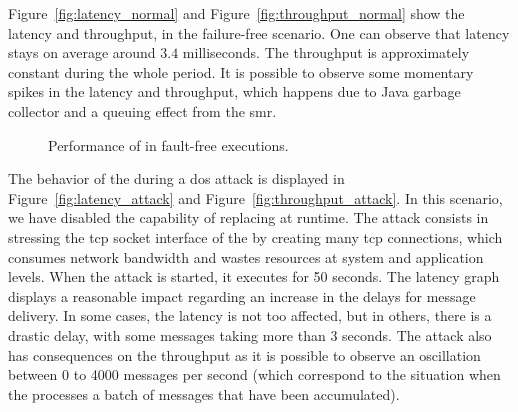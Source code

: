 Figure~\ref{fig:latency_normal} and Figure~\ref{fig:throughput_normal} show the latency and throughput, in the failure-free scenario.
One can observe that latency stays on average around $3.4$ milliseconds.
The throughput is approximately constant during the whole period.
It is possible to observe some momentary spikes in the latency and throughput, which happens due to Java garbage collector and a queuing effect from the \gls{smr}.

\begin{figure}[h]

\hspace{-5mm}
\caption{Performance of \sieveq in fault-free executions.}
\end{figure}




The behavior of the \sieveq during a \gls{dos} attack is displayed in Figure~\ref{fig:latency_attack} and Figure~\ref{fig:throughput_attack}.
In this scenario, we have disabled the \sieveq capability of replacing \presieves at runtime.
The attack consists in stressing the \gls{tcp} socket interface of the \presieves by creating many \gls{tcp} connections, which consumes network bandwidth and wastes resources at system and application levels. When the attack is started, it executes for 50 seconds. The latency graph displays a reasonable impact regarding an increase in the delays for message delivery. 
In some cases, the latency is not too affected, but in others, there is a drastic delay, with some messages taking more than 3 seconds.
The attack also has consequences on the throughput as it is possible to observe an oscillation between 0 to 4000 messages per second (which correspond to the situation when the \postsieve processes a batch of messages that have been accumulated).


